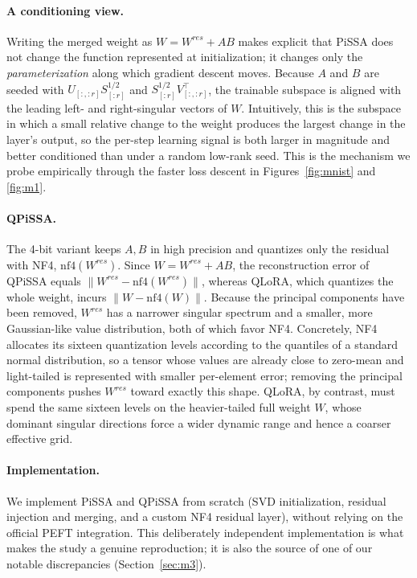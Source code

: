 \documentclass[mlmain]{jmlr}
\begin{document}
\paragraph{A conditioning view.} Writing the merged weight as $W = W^{res} + AB$ makes explicit that PiSSA does not change the function represented at initialization; it changes only the \emph{parameterization} along which gradient descent moves. Because $A$ and $B$ are seeded with $U_{[:,:r]}S^{1/2}_{[:r]}$ and $S^{1/2}_{[:r]}V_{[:,:r]}^\top$, the trainable subspace is aligned with the leading left- and right-singular vectors of $W$. Intuitively, this is the subspace in which a small relative change to the weight produces the largest change in the layer's output, so the per-step learning signal is both larger in magnitude and better conditioned than under a random low-rank seed. This is the mechanism we probe empirically through the faster loss descent in Figures~\ref{fig:mnist} and \ref{fig:m1}.

\paragraph{QPiSSA.} The 4-bit variant keeps $A,B$ in high precision and quantizes only the residual with NF4, $\mathrm{nf4}(W^{res})$. Since $W = W^{res}+AB$, the reconstruction error of QPiSSA equals $\lVert W^{res}-\mathrm{nf4}(W^{res})\rVert$, whereas QLoRA, which quantizes the whole weight, incurs $\lVert W-\mathrm{nf4}(W)\rVert$. Because the principal components have been removed, $W^{res}$ has a narrower singular spectrum and a smaller, more Gaussian-like value distribution, both of which favor NF4. Concretely, NF4 allocates its sixteen quantization levels according to the quantiles of a standard normal distribution, so a tensor whose values are already close to zero-mean and light-tailed is represented with smaller per-element error; removing the principal components pushes $W^{res}$ toward exactly this shape. QLoRA, by contrast, must spend the same sixteen levels on the heavier-tailed full weight $W$, whose dominant singular directions force a wider dynamic range and hence a coarser effective grid.

\paragraph{Implementation.} We implement PiSSA and QPiSSA from scratch (SVD initialization, residual injection and merging, and a custom NF4 residual layer), without relying on the official PEFT integration. This deliberately independent implementation is what makes the study a genuine reproduction; it is also the source of one of our notable discrepancies (Section~\ref{sec:m3}).
\end{document}
